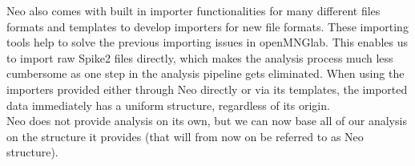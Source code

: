 Neo also comes with built in importer functionalities for many different files formats and templates to develop importers for new file formats.  These importing tools help to solve the previous importing issues in openMNGlab. This enables us to import raw Spike2 files directly, which makes the analysis process much less cumbersome as one step in the analysis pipeline gets eliminated. 
When using the importers provided either through Neo directly or via its templates, the imported data immediately has a uniform structure, regardless of its origin. \\
Neo does not provide analysis on its own, but we can now base all of our analysis on the structure it provides (that will from now on be referred to as Neo structure). \\








